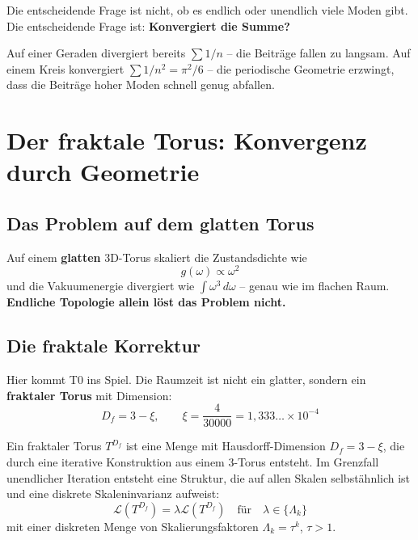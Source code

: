 	Die entscheidende Frage ist nicht, ob es endlich oder unendlich viele Moden gibt. Die entscheidende Frage ist: \textbf{Konvergiert die Summe?}
	
	Auf einer Geraden divergiert bereits $\sum 1/n$ -- die Beiträge fallen zu langsam. Auf einem Kreis konvergiert $\sum 1/n^2 = \pi^2/6$ -- die periodische Geometrie erzwingt, dass die Beiträge hoher Moden schnell genug abfallen.
	
	
	\section{Der fraktale Torus: Konvergenz durch Geometrie}
	
	\subsection{Das Problem auf dem glatten Torus}
	
	Auf einem \textbf{glatten} 3D-Torus skaliert die Zustandsdichte wie
	\begin{equation}
		g(\omega) \propto \omega^{2}
	\end{equation}
	und die Vakuumenergie divergiert wie $\int \omega^3 \, d\omega$ -- genau wie im flachen Raum. \textbf{Endliche Topologie allein löst das Problem nicht.}
	
	\subsection{Die fraktale Korrektur}
	
	Hier kommt T0 ins Spiel. Die Raumzeit ist nicht ein glatter, sondern ein \textbf{fraktaler Torus} mit Dimension:
	\begin{equation}
		D_f = 3 - \xi, \qquad \xi = \frac{4}{30000} = 1{,}333\ldots \times 10^{-4}
	\end{equation}
	
	\begin{keypoint}
		Ein fraktaler Torus $T^{D_f}$ ist eine Menge mit Hausdorff-Dimension $D_f = 3 - \xi$, die durch eine iterative Konstruktion aus einem 3-Torus entsteht. Im Grenzfall unendlicher Iteration entsteht eine Struktur, die auf allen Skalen selbstähnlich ist und eine diskrete Skaleninvarianz aufweist:
		\begin{equation}
			\mathcal{L}(T^{D_f}) = \lambda \mathcal{L}(T^{D_f}) \quad \text{für} \quad \lambda \in \{\Lambda_k\}
		\end{equation}
		mit einer diskreten Menge von Skalierungsfaktoren $\Lambda_k = \tau^k$, $\tau > 1$.
	\end{keypoint}
	
